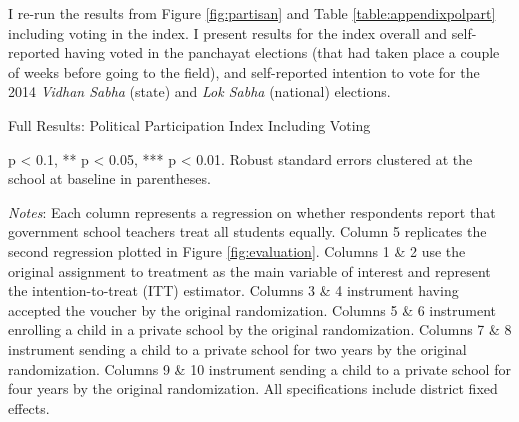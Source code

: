 \documentclass[hidelinks, 12pt, titlepage]{article}
\begin{document}
			I re-run the results from Figure \ref{fig:partisan} and Table \ref{table:appendixpolpart} including voting in the index.  I present results for the index overall and self-reported having voted in the panchayat elections (that had taken place a couple of weeks before going to the field), and self-reported intention to vote for the 2014 \emph{Vidhan Sabha} (state) and \emph{Lok Sabha} (national) elections.

			\begin{landscape}

				\begin{table}
					\begin{threeparttable}
						\centering
						\caption{Full Results: Political Participation Index Including Voting\label{table:appendixpolpartvoting}}
						
						\begin{tablenotes}
							\item * p < 0.1, ** p < 0.05, *** p < 0.01. Robust standard errors clustered at the school at baseline in parentheses.
							\item \emph{Notes}: Each column represents a regression on whether respondents report that government school teachers treat all students equally.  Column 5 replicates the second regression plotted in Figure \ref{fig:evaluation}.  Columns 1 \& 2 use the original assignment to treatment as the main variable of interest and represent the intention-to-treat (ITT) estimator.  Columns 3 \& 4 instrument having accepted the voucher by the original randomization.  Columns 5 \& 6 instrument enrolling a child in a private school by the original randomization.  Columns 7 \& 8 instrument sending a child to a private school for two years by the original randomization.  Columns 9 \& 10 instrument sending a child to a private school for four years by the original randomization.  All specifications include district fixed effects.
						\end{tablenotes}
					\end{threeparttable}
				\end{table}

				\clearpage


\end{landscape}
\end{document}
